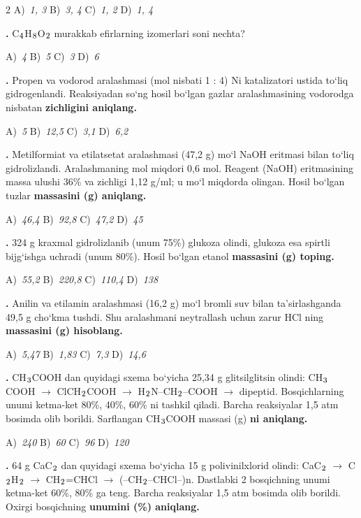 \documentclass[11pt,a4paper]{article}
\renewcommand{\textsubscript}[1]{\ensuremath{_{\text{\fontsize{8}{8}\selectfont #1}}}}
\newcommand{\qn}[1]{\textbf{\fontsize{11.5}{13}\selectfont #1}}
\newcommand{\qsep}{\par\vspace{13pt}}
\begin{document}
\begin{multicols}{2}
\noindent A)~\textsl{1, 3} \hfill B)~\textsl{3, 4} \hfill C)~\textsl{1, 2} \hfill D)~\textsl{1, 4}\par
\qsep
\noindent\qn{22.} C\textsubscript{4}H\textsubscript{8}O\textsubscript{2} murakkab efirlarning izomerlari soni nechta?

\noindent A)~\textsl{4} \hfill B)~\textsl{5} \hfill C)~\textsl{3} \hfill D)~\textsl{6}\par
\qsep
\noindent\qn{23.} Propen va vodorod aralashmasi (mol nisbati 1 : 4) Ni katalizatori ustida to`liq gidrogenlandi. Reaksiyadan so`ng hosil bo`lgan gazlar aralashmasining vodorodga nisbatan \textbf{zichligini aniqlang.}

\noindent A)~\textsl{5} \hfill B)~\textsl{12,5} \hfill C)~\textsl{3,1} \hfill D)~\textsl{6,2}\par
\qsep
\noindent\qn{24.} Metilformiat va etilatsetat aralashmasi (47,2 g) mo`l NaOH eritmasi bilan to`liq gidrolizlandi. Aralashmaning mol miqdori 0,6 mol. Reagent (NaOH) eritmasining massa ulushi 36\% va zichligi 1,12 g/ml; u mo`l miqdorda olingan. Hosil bo`lgan tuzlar \textbf{massasini (g) aniqlang.}

\noindent A)~\textsl{46,4} \hfill B)~\textsl{92,8} \hfill C)~\textsl{47,2} \hfill D)~\textsl{45}\par
\qsep
\noindent\qn{25.} 324 g kraxmal gidrolizlanib (unum 75\%) glukoza olindi, glukoza esa spirtli bijg`ishga uchradi (unum 80\%). Hosil bo`lgan etanol \textbf{massasini (g) toping.}

\noindent A)~\textsl{55,2} \hfill B)~\textsl{220,8} \hfill C)~\textsl{110,4} \hfill D)~\textsl{138}\par
\qsep
\noindent\qn{26.} Anilin va etilamin aralashmasi (16,2 g) mo`l bromli suv bilan ta'sirlashganda 49,5 g cho`kma tushdi. Shu aralashmani neytrallash uchun zarur HCl ning \textbf{massasini (g) hisoblang.}

\noindent A)~\textsl{5,47} \hfill B)~\textsl{1,83} \hfill C)~\textsl{7,3} \hfill D)~\textsl{14,6}\par
\qsep
\noindent\qn{27.} CH\textsubscript{3}COOH dan quyidagi sxema bo`yicha 25,34 g glitsilglitsin olindi: CH\textsubscript{3}COOH $\to$ ClCH\textsubscript{2}COOH $\to$ H\textsubscript{2}N--CH\textsubscript{2}--COOH $\to$ dipeptid. Bosqichlarning unumi ketma-ket 80\%, 40\%, 60\% ni tashkil qiladi. Barcha reaksiyalar 1,5 atm bosimda olib borildi. Sarflangan CH\textsubscript{3}COOH massasi (g) \textbf{ni aniqlang.}

\noindent A)~\textsl{240} \hfill B)~\textsl{60} \hfill C)~\textsl{96} \hfill D)~\textsl{120}\par
\qsep
\noindent\qn{28.} 64 g CaC\textsubscript{2} dan quyidagi sxema bo`yicha 15 g polivinilxlorid olindi: CaC\textsubscript{2} $\to$ C\textsubscript{2}H\textsubscript{2} $\to$ CH\textsubscript{2}=CHCl $\to$ (--CH\textsubscript{2}--CHCl--)n. Dastlabki 2 bosqichning unumi ketma-ket 60\%, 80\% ga teng. Barcha reaksiyalar 1,5 atm bosimda olib borildi. Oxirgi bosqichning \textbf{unumini (\%) aniqlang.}


\end{multicols}
\end{document}
